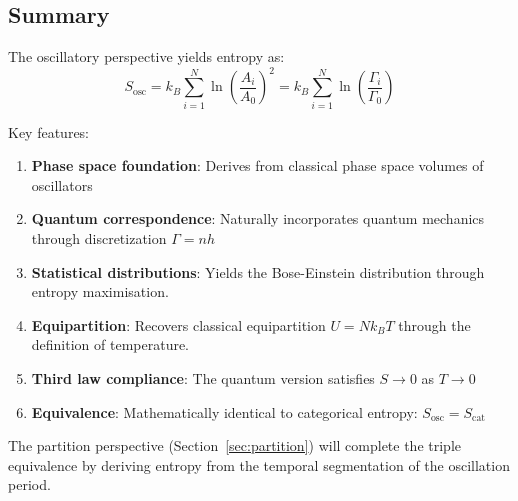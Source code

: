 \subsection{Summary}

The oscillatory perspective yields entropy as:
\begin{equation}
S_{\text{osc}} = k_B \sum_{i=1}^{N} \ln\left(\frac{A_i}{A_0}\right)^2 = k_B \sum_{i=1}^{N} \ln\left(\frac{\Gamma_i}{\Gamma_0}\right)
\end{equation}

Key features:
\begin{enumerate}
\item \textbf{Phase space foundation}: Derives from classical phase space volumes of oscillators
\item \textbf{Quantum correspondence}: Naturally incorporates quantum mechanics through discretization $\Gamma = nh$
\item \textbf{Statistical distributions}: Yields the Bose-Einstein distribution through entropy maximisation.
\item \textbf{Equipartition}: Recovers classical equipartition $U = Nk_BT$ through the definition of temperature.
\item \textbf{Third law compliance}: The quantum version satisfies $S \to 0$ as $T \to 0$
\item \textbf{Equivalence}: Mathematically identical to categorical entropy: $S_{\text{osc}} = S_{\text{cat}}$
\end{enumerate}

The partition perspective (Section~\ref{sec:partition}) will complete the triple equivalence by deriving entropy from the temporal segmentation of the oscillation period.
